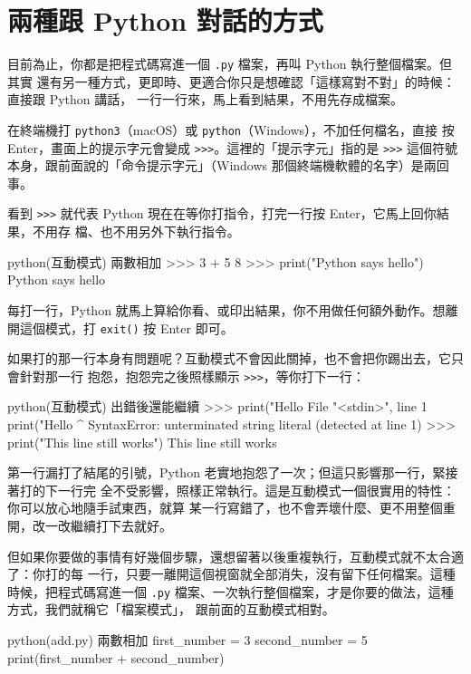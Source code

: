 \section{兩種跟 Python 對話的方式}
\label{sec:interpreter-vs-file}

目前為止，你都是把程式碼寫進一個 \texttt{.py} 檔案，再叫 Python 執行整個檔案。但其實
還有另一種方式，更即時、更適合你只是想確認「這樣寫對不對」的時候：直接跟 Python 講話，
一行一行來，馬上看到結果，不用先存成檔案。

在終端機打 \texttt{python3}（macOS）或 \texttt{python}（Windows），不加任何檔名，直接
按 Enter，畫面上的提示字元會變成 \texttt{>>>}。這裡的「提示字元」指的是 \texttt{>>>}
這個符號本身，跟前面說的「命令提示字元」（Windows 那個終端機軟體的名字）是兩回事。

看到
\texttt{>>>} 就代表 Python 現在在等你打指令，打完一行按 Enter，它馬上回你結果，不用存
檔、也不用另外下執行指令。

\begin{example}{python}{(互動模式) 兩數相加}
>>> 3 + 5
8
>>> print("Python says hello")
Python says hello
\end{example}

每打一行，Python 就馬上算給你看、或印出結果，你不用做任何額外動作。想離開這個模式，打
\texttt{exit()} 按 Enter 即可。

如果打的那一行本身有問題呢？互動模式不會因此關掉，也不會把你踢出去，它只會針對那一行
抱怨，抱怨完之後照樣顯示 \texttt{>>>}，等你打下一行：

\begin{example}{python}{(互動模式) 出錯後還能繼續}
>>> print("Hello
  File "<stdin>", line 1
    print("Hello
          ^
SyntaxError: unterminated string literal (detected at line 1)
>>> print("This line still works")
This line still works
\end{example}

第一行漏打了結尾的引號，Python 老實地抱怨了一次；但這只影響那一行，緊接著打的下一行完
全不受影響，照樣正常執行。這是互動模式一個很實用的特性：你可以放心地隨手試東西，就算
某一行寫錯了，也不會弄壞什麼、更不用整個重開，改一改繼續打下去就好。

但如果你要做的事情有好幾個步驟，還想留著以後重複執行，互動模式就不太合適了：你打的每
一行，只要一離開這個視窗就全部消失，沒有留下任何檔案。這種時候，把程式碼寫進一個
\texttt{.py} 檔案、一次執行整個檔案，才是你要的做法，這種方式，我們就稱它「檔案模式」，
跟前面的互動模式相對。

\begin{example}{python}{(add.py) 兩數相加}
first_number = 3
second_number = 5
print(first_number + second_number)
\end{example}

